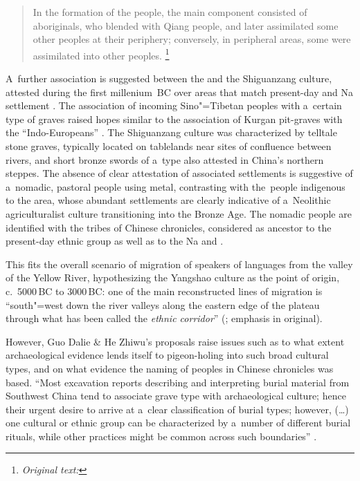 \begin{quote} 
	In the formation of the  people, the main component consisted of aboriginals, who blended with Qiang  people, and later assimilated some other peoples at their periphery; conversely, in peripheral areas, some  were assimilated into other peoples. 
	\citep[24]{guoetal1994}\footnote{\textit{Original text:} 
		} 
\end{quote}

{\noindent}A~further association is suggested between the  and the Shiguanzang  culture, attested during the first millenium \,BC over areas that match present-day  and Na settlement \citep[66-67]{guoetal1994}. The association of incoming Sino"=Tibetan peoples with a~certain type of graves raised hopes similar to the association of Kurgan pit-graves with the “Indo-Europeans” \citep{gimbutas1977,anthony2010}. The Shiguanzang culture was characterized by telltale stone graves, typically located on tablelands near sites of confluence between rivers, and short bronze swords of a~type also attested in China's northern steppes. The absence of clear attestation of associated settlements is suggestive of a~nomadic, pastoral people using metal, contrasting with the~people indigenous to the area, whose abundant settlements are clearly indicative of a~Neolithic agriculturalist culture transitioning into the Bronze Age. The nomadic people are identified with the   tribes of {Chinese} chronicles, considered as ancestor to the present-day   ethnic group as well as to the Na and  \citep[64-66]{guoetal1994}. 

This fits the overall scenario of migration of speakers of  languages from the valley of the Yellow River, hypothesizing the Yangshao  culture as the point of origin, c.~5000\,BC to 3000\,BC: one of the main {reconstructed} lines of migration is “south"=west down the river valleys along the eastern edge of the  plateau through what has been called the \textit{ethnic corridor}” (\citealt[236]{lapolla2001}; emphasis in original).

However, Guo Dalie \& He Zhiwu's proposals raise issues such as to what extent archaeological evidence lends itself to pigeon-holing into such broad cultural types, and on what evidence the naming of peoples in Chinese chronicles was based. “Most excavation reports describing and interpreting burial material from Southwest China tend to associate grave type with archaeological culture; hence their urgent desire to arrive
at a~clear classification of burial types; however, ({\dots}) one cultural or ethnic group can be characterized by
a~number of different burial rituals, while other practices might be common across such
boundaries” \citep[31]{hein2013}. 

